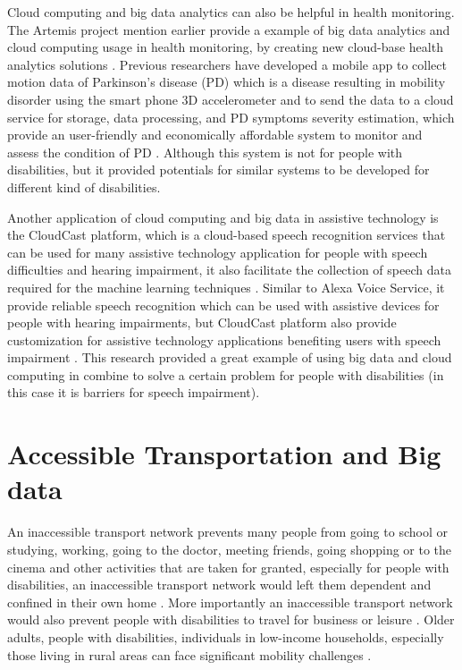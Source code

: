 Cloud computing and big data analytics can also be helpful in health monitoring. The Artemis project mention earlier
provide a example of big data analytics and cloud computing usage in health monitoring, by creating new cloud-base
health analytics solutions \cite{Khazaei14}. Previous researchers have developed a mobile app to collect motion 
data of Parkinson's disease (PD) which is a disease resulting in mobility disorder using the smart phone 3D 
accelerometer and to send the data to a cloud service for storage, data processing, and PD symptoms severity
estimation, which provide an user-friendly and economically affordable system to monitor and assess the condition
of PD \cite{info:doi/10.2196/mhealth.3956}. Although this system is not for people with disabilities, but it 
provided potentials for similar systems to be developed for different kind of disabilities. 

Another application of cloud computing and big data in assistive technology is the CloudCast platform, which is a 
cloud-based speech recognition services that can be used for many assistive technology application for people
with speech difficulties and hearing impairment, it also facilitate the collection of speech data required for
the machine learning techniques \cite{cunningham2017cloud}. Similar to Alexa Voice Service, it provide reliable 
speech recognition which can be used with assistive devices for people with hearing impairments, but CloudCast
platform also provide customization for assistive technology applications benefiting users with speech 
impairment \cite{cunningham2017cloud}. This research provided a great example of using big data and cloud 
computing in combine to solve a certain problem for people with disabilities (in this case it is barriers for speech impairment). 

\section{Accessible Transportation and Big data}

An inaccessible transport network prevents many people from going to school or studying, working,
going to the doctor, meeting friends, going shopping or to the cinema and other activities that
are taken for granted, especially for people with disabilities, an inaccessible transport
network would left them dependent and confined in their own home \cite{Ama}. More importantly an
inaccessible transport network would also prevent people with disabilities to
travel for business or leisure \cite{milo}.
Older adults, people with disabilities, individuals in low-income households, especially 
those living in rural areas can face significant mobility challenges \cite{moya2016dynamic}. 

